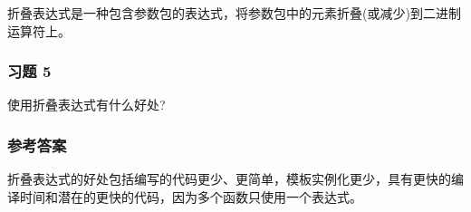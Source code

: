 折叠表达式是一种包含参数包的表达式，将参数包中的元素折叠(或减少)到二进制运算符上。

\subsubsection{习题 5}

使用折叠表达式有什么好处?

\subsubsection{参考答案}

折叠表达式的好处包括编写的代码更少、更简单，模板实例化更少，具有更快的编译时间和潜在的更快的代码，因为多个函数只使用一个表达式。













